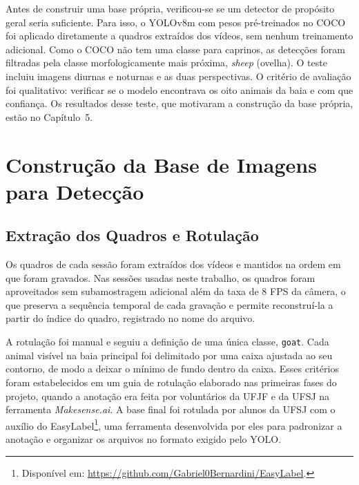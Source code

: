 Antes de construir uma base própria, verificou-se se um detector de propósito geral seria suficiente. Para isso, o YOLOv8m com pesos pré-treinados no COCO \cite{jocher2023yolov8, journals/corr/LinMBHPRDZ14} foi aplicado diretamente a quadros extraídos dos vídeos, sem nenhum treinamento adicional. Como o COCO não tem uma classe para caprinos, as detecções foram filtradas pela classe morfologicamente mais próxima, \textit{sheep} (ovelha). O teste incluiu imagens diurnas e noturnas e as duas perspectivas. O critério de avaliação foi qualitativo: verificar se o modelo encontrava os oito animais da baia e com que confiança. Os resultados desse teste, que motivaram a construção da base própria, estão no Capítulo~5.

\section{Construção da Base de Imagens para Detecção}
\label{sec:base-deteccao}

\subsection{Extração dos Quadros e Rotulação}
\label{subsec:rotulacao}

Os quadros de cada sessão foram extraídos dos vídeos e mantidos na ordem em que foram gravados. Nas sessões usadas neste trabalho, os quadros foram aproveitados sem subamostragem adicional além da taxa de 8 FPS da câmera, o que preserva a sequência temporal de cada gravação e permite reconstruí-la a partir do índice do quadro, registrado no nome do arquivo. 

A rotulação foi manual e seguiu a definição de uma única classe, \texttt{goat}. Cada animal visível na baia principal foi delimitado por uma caixa ajustada ao seu contorno, de modo a deixar o mínimo de fundo dentro da caixa. Esses critérios foram estabelecidos em um guia de rotulação elaborado nas primeiras fases do projeto, quando a anotação era feita por voluntários da UFJF e da UFSJ na ferramenta \textit{Makesense.ai}. A base final foi rotulada por alunos da UFSJ com o auxílio do EasyLabel\footnote{Disponível em: \url{https://github.com/Gabriel0Bernardini/EasyLabel}.}, uma ferramenta desenvolvida por eles para padronizar a anotação e organizar os arquivos no formato exigido pelo YOLO. 

